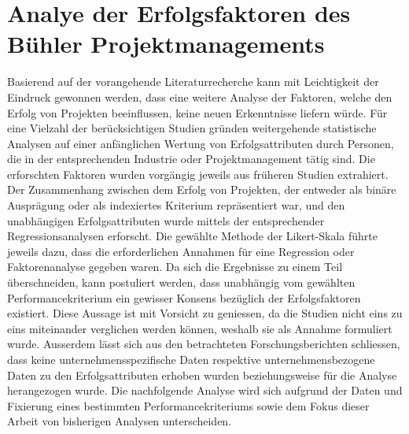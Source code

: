 \section{Analye der Erfolgsfaktoren des Bühler Projektmanagements}\label{drei}
Basierend auf der vorangehende Literaturrecherche kann mit Leichtigkeit der Eindruck gewonnen werden, dass eine weitere Analyse der Faktoren, welche den Erfolg von Projekten beeinflussen, keine neuen Erkenntnisse liefern würde. Für eine Vielzahl der berücksichtigen Studien gründen weitergehende statistische Analysen auf einer anfänglichen Wertung von Erfolgsattributen durch Personen, die in der entsprechenden Industrie oder Projektmanagement tätig sind. Die erforschten Faktoren wurden vorgängig jeweils aus früheren Studien extrahiert. Der Zusammenhang zwischen dem Erfolg von Projekten, der entweder als binäre Ausprägung oder als indexiertes Kriterium repräsentiert war, und den unabhängigen Erfolgsattributen wurde mittels der entsprechender Regressionsanalysen erforscht. Die gewählte Methode der Likert-Skala führte jeweils dazu, dass die erforderlichen Annahmen für eine Regression oder Faktorenanalyse gegeben waren. Da sich die Ergebnisse zu einem Teil überschneiden, kann postuliert werden, dass unabhängig vom gewählten Performancekriterium ein gewisser Konsens bezüglich der Erfolgsfaktoren existiert. Diese Aussage ist mit Vorsicht zu geniessen, da die Studien nicht eins zu eins miteinander verglichen werden können, weshalb sie als Annahme formuliert wurde. Ausserdem lässt sich aus den betrachteten Forschungsberichten schliessen, dass keine unternehmensspezifische Daten respektive unternehmensbezogene Daten zu den Erfolgsattributen erhoben wurden beziehungsweise für die Analyse herangezogen wurde.\newline
Die nachfolgende Analyse wird sich aufgrund der Daten und Fixierung eines bestimmten Performancekriteriums sowie dem Fokus dieser Arbeit von bisherigen Analysen unterscheiden. 
